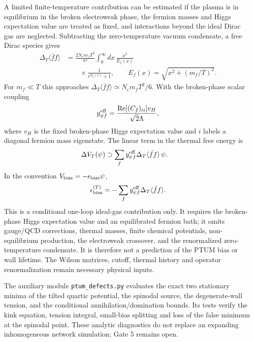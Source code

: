 \documentclass[epj]{svjour}
\begin{document}
A limited finite-temperature contribution can be estimated if the
plasma is in equilibrium in the broken electroweak phase, the fermion
masses and Higgs expectation value are treated as fixed, and
interactions beyond the ideal Dirac gas are neglected. Subtracting
the zero-temperature vacuum condensate, a free Dirac species gives
\begin{equation}
\begin{aligned}
\Delta_T\langle\bar f f\rangle
&=\frac{2N_c m_f T^2}{\pi^2}
\int_0^\infty dx\,\frac{x^2}{E_f(x)}\\
&\qquad\times\frac{1}{e^{E_f(x)}+1},
\qquad E_f(x)=\sqrt{x^2+(m_f/T)^2}.
\end{aligned}
\label{eq:ptum_thermal_fermion_condensate}
\end{equation}
For $m_f\ll T$ this approaches
$\Delta_T\langle\bar f f\rangle\simeq N_c m_fT^2/6$.
With the broken-phase scalar coupling
\begin{equation}
y_{\psi f}^{\rm eff}
=\frac{\operatorname{Re}[(C_f)_{ii}]v_H}{\sqrt2\Lambda},
\end{equation}
where $v_H$ is the fixed broken-phase Higgs expectation value and
$i$ labels a diagonal fermion mass eigenstate. The linear term in the
thermal free energy is
\begin{equation}
\begin{aligned}
\Delta V_T(\psi)
&\supset \sum_f y_{\psi f}^{\rm eff}
\Delta_T\langle\bar f f\rangle\,\psi .
\end{aligned}
\end{equation}
In the convention $V_{\rm bias}=-\epsilon_{\rm bias}\psi$,
\begin{equation}
\epsilon_{\rm bias}^{(T)}
=-\sum_f y_{\psi f}^{\rm eff}
\Delta_T\langle\bar f f\rangle.
\label{eq:ptum_thermal_bias}
\end{equation}
This is a conditional one-loop ideal-gas contribution only. It
requires the broken-phase Higgs expectation value and an equilibrated
fermion bath; it omits gauge/QCD corrections, thermal masses,
finite chemical potentials, non-equilibrium production, the
electroweak crossover, and the renormalized zero-temperature
condensate. It is therefore not a prediction of the PTUM bias or
wall lifetime. The Wilson matrices, cutoff, thermal history and
operator renormalization remain necessary physical inputs.

The auxiliary module \texttt{ptum\_defects.py} evaluates the exact two
stationary minima of the tilted quartic potential, the spinodal
source, the degenerate-wall tension, and the conditional
annihilation/domination bounds. Its tests verify the kink equation,
tension integral, small-bias splitting and loss of the false
minimum at the spinodal point. These analytic diagnostics do not
replace an expanding inhomogeneous network simulation; Gate 5
remains open.
\end{document}
